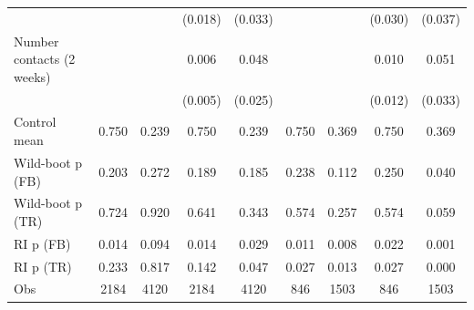 {\begin{tabular}{l*{8}{c}}
                    &                     &                     &     (0.018)         &     (0.033)         &                     &                     &     (0.030)         &     (0.037)         \\
Number contacts (2 weeks)&                     &                     &       0.006         &       0.048         &                     &                     &       0.010         &       0.051         \\
                    &                     &                     &     (0.005)         &     (0.025)         &                     &                     &     (0.012)         &     (0.033)         \\
\midrule
Control mean        &       0.750         &       0.239         &       0.750         &       0.239         &       0.750         &       0.369         &       0.750         &       0.369         \\
Wild-boot p (FB)    &       0.203         &       0.272         &       0.189         &       0.185         &       0.238         &       0.112         &       0.250         &       0.040         \\
Wild-boot p (TR)    &       0.724         &       0.920         &       0.641         &       0.343         &       0.574         &       0.257         &       0.574         &       0.059         \\
RI p (FB)           &       0.014         &       0.094         &       0.014         &       0.029         &       0.011         &       0.008         &       0.022         &       0.001         \\
RI p (TR)           &       0.233         &       0.817         &       0.142         &       0.047         &       0.027         &       0.013         &       0.027         &       0.000         \\
Obs                 &        2184         &        4120         &        2184         &        4120         &         846         &        1503         &         846         &        1503         \\
\bottomrule
\end{tabular}
}
